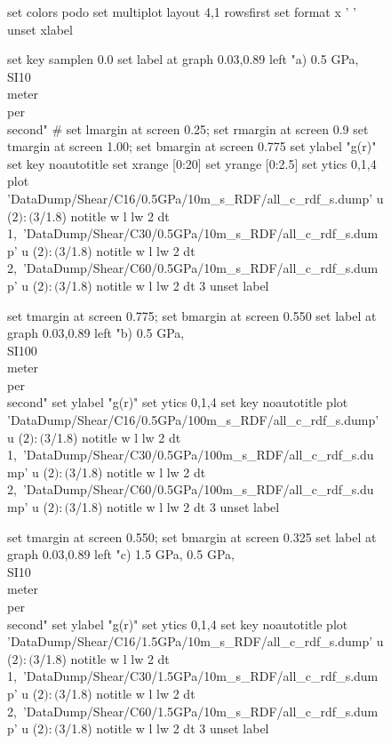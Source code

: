 \documentclass[5p]{elsarticle}
\begin{document}
\begin{figure}[htp]
    	\begin{center}
		\begin{gnuplot}[terminal=epslatex, terminaloptions={size \SERFigwidth cm, \SERFigheight cm color solid}]
			set colors podo
			set multiplot layout 4,1 rowsfirst
			set format x ' '
			unset xlabel

			set key samplen  0.0
			set label at graph 0.03,0.89 left "a) 0.5 GPa, \\SI{10}{\\meter\\per\\second}"
#			set lmargin at screen 0.25; set rmargin at screen 0.9
			set tmargin at screen 1.00; set bmargin at screen 0.775
			set ylabel "g(r)"
			set key noautotitle
			set xrange [0:20]
			set yrange [0:2.5]
			set ytics 0,1,4
			plot  	'DataDump/Shear/C16/0.5GPa/10m_s_RDF/all_c_rdf_s.dump' u  ($2):($3/1.8) notitle   w l lw 2  dt 1,\
		        	'DataDump/Shear/C30/0.5GPa/10m_s_RDF/all_c_rdf_s.dump' u  ($2):($3/1.8) notitle   w l lw 2 dt 2,\
		        	'DataDump/Shear/C60/0.5GPa/10m_s_RDF/all_c_rdf_s.dump' u  ($2):($3/1.8) notitle   w l lw 2 dt 3
	    	unset label


			set tmargin at screen 0.775; set bmargin at screen 0.550
			set label at graph 0.03,0.89 left "b) 0.5 GPa, \\SI{100}{\\meter\\per\\second}"
			set ylabel "g(r)"
			set ytics 0,1,4
			set key noautotitle
			plot  	'DataDump/Shear/C16/0.5GPa/100m_s_RDF/all_c_rdf_s.dump' u  ($2):($3/1.8) notitle w l lw 2 dt 1,\
		        	'DataDump/Shear/C30/0.5GPa/100m_s_RDF/all_c_rdf_s.dump' u  ($2):($3/1.8) notitle   w l lw 2 dt 2,\
		        	'DataDump/Shear/C60/0.5GPa/100m_s_RDF/all_c_rdf_s.dump' u  ($2):($3/1.8) notitle  w l lw 2 dt 3
	    	unset label



			set tmargin at screen 0.550; set bmargin at screen 0.325
			set label at graph 0.03,0.89 left "c) 1.5 GPa, 0.5 GPa, \\SI{10}{\\meter\\per\\second}"
			set ylabel "g(r)"
			set ytics 0,1,4
			set key noautotitle
			plot  	'DataDump/Shear/C16/1.5GPa/10m_s_RDF/all_c_rdf_s.dump' u  ($2):($3/1.8) notitle   w l lw 2 dt 1,\
		        	'DataDump/Shear/C30/1.5GPa/10m_s_RDF/all_c_rdf_s.dump' u  ($2):($3/1.8) notitle   w l lw 2 dt 2,\
		        	'DataDump/Shear/C60/1.5GPa/10m_s_RDF/all_c_rdf_s.dump' u  ($2):($3/1.8) notitle   w l lw 2 dt 3
	    	unset label


\end{gnuplot}
\end{center}
\end{figure}
\end{document}
